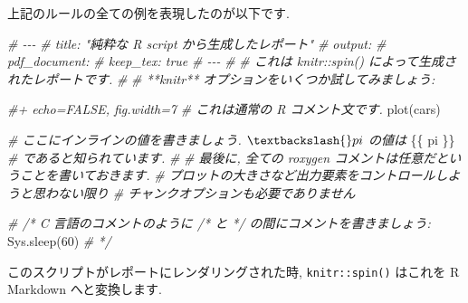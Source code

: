 \documentclass[
  11pt,
]{bxjsreport}
\newenvironment{Shaded}{\begin{snugshade}}{\end{snugshade}}
\newcommand{\CommentTok}[1]{\textcolor[rgb]{0.56,0.35,0.01}{\textit{#1}}}
\newcommand{\DecValTok}[1]{\textcolor[rgb]{0.00,0.00,0.81}{#1}}
\newcommand{\FunctionTok}[1]{\textcolor[rgb]{0.00,0.00,0.00}{#1}}
\newcommand{\NormalTok}[1]{#1}
\begin{document}
上記のルールの全ての例を表現したのが以下です.

\begin{Shaded}
\begin{Highlighting}[]
\CommentTok{\#\textquotesingle{} {-}{-}{-}}
\CommentTok{\#\textquotesingle{} title: "純粋な R script から生成したレポート"}
\CommentTok{\#\textquotesingle{} output:}
\CommentTok{\#\textquotesingle{}   pdf\_document:}
\CommentTok{\#\textquotesingle{}     keep\_tex: true}
\CommentTok{\#\textquotesingle{} {-}{-}{-}}
\CommentTok{\#\textquotesingle{}}
\CommentTok{\#\textquotesingle{} これは \textasciigrave{}knitr::spin()\textasciigrave{} によって生成されたレポートです.}
\CommentTok{\#\textquotesingle{}}
\CommentTok{\#\textquotesingle{} **knitr** オプションをいくつか試してみましょう:}

\CommentTok{\#+ echo=FALSE, fig.width=7}
\CommentTok{\#  これは通常の R コメント文です.}
\FunctionTok{plot}\NormalTok{(cars)}

\CommentTok{\#\textquotesingle{} ここにインラインの値を書きましょう. $\textbackslash{}pi$ の値は}
\NormalTok{\{\{ pi \}\}}
\CommentTok{\#\textquotesingle{} であると知られています.}
\CommentTok{\#\textquotesingle{}}
\CommentTok{\#\textquotesingle{} 最後に, 全ての roxygen コメントは任意だということを書いておきます.}
\CommentTok{\#\textquotesingle{} プロットの大きさなど出力要素をコントロールしようと思わない限り}
\CommentTok{\#\textquotesingle{} チャンクオプションも必要でありません}

\CommentTok{\# /* C 言語のコメントのように /* と */ の間にコメントを書きましょう:}
\FunctionTok{Sys.sleep}\NormalTok{(}\DecValTok{60}\NormalTok{)}
\CommentTok{\# */}
\end{Highlighting}
\end{Shaded}

このスクリプトがレポートにレンダリングされた時, \texttt{knitr::spin()} はこれを R Markdown へと変換します.
\end{document}
